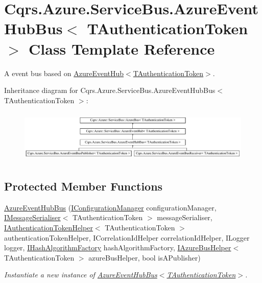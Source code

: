 \hypertarget{classCqrs_1_1Azure_1_1ServiceBus_1_1AzureEventHubBus}{}\section{Cqrs.\+Azure.\+Service\+Bus.\+Azure\+Event\+Hub\+Bus$<$ T\+Authentication\+Token $>$ Class Template Reference}
\label{classCqrs_1_1Azure_1_1ServiceBus_1_1AzureEventHubBus}


A event bus based on \hyperlink{classCqrs_1_1Azure_1_1ServiceBus_1_1AzureEventHub_a2b548165ac5b1e3d0312af5c62e3c6cd_a2b548165ac5b1e3d0312af5c62e3c6cd}{Azure\+Event\+Hub$<$\+T\+Authentication\+Token$>$}.  


Inheritance diagram for Cqrs.\+Azure.\+Service\+Bus.\+Azure\+Event\+Hub\+Bus$<$ T\+Authentication\+Token $>$\+:\begin{figure}[H]
\begin{center}
\leavevmode
\includegraphics[height=2.533937cm]{classCqrs_1_1Azure_1_1ServiceBus_1_1AzureEventHubBus}
\end{center}
\end{figure}
\subsection*{Protected Member Functions}
\begin{DoxyCompactItemize}
\item 
\hyperlink{classCqrs_1_1Azure_1_1ServiceBus_1_1AzureEventHubBus_a1012686c6448f1cee1d06aca0a605df4_a1012686c6448f1cee1d06aca0a605df4}{Azure\+Event\+Hub\+Bus} (\hyperlink{interfaceCqrs_1_1Configuration_1_1IConfigurationManager}{I\+Configuration\+Manager} configuration\+Manager, \hyperlink{interfaceCqrs_1_1Azure_1_1ServiceBus_1_1IMessageSerialiser}{I\+Message\+Serialiser}$<$ T\+Authentication\+Token $>$ message\+Serialiser, \hyperlink{interfaceCqrs_1_1Authentication_1_1IAuthenticationTokenHelper}{I\+Authentication\+Token\+Helper}$<$ T\+Authentication\+Token $>$ authentication\+Token\+Helper, I\+Correlation\+Id\+Helper correlation\+Id\+Helper, I\+Logger logger, \hyperlink{interfaceCqrs_1_1Bus_1_1IHashAlgorithmFactory}{I\+Hash\+Algorithm\+Factory} hash\+Algorithm\+Factory, \hyperlink{interfaceCqrs_1_1Azure_1_1ServiceBus_1_1IAzureBusHelper}{I\+Azure\+Bus\+Helper}$<$ T\+Authentication\+Token $>$ azure\+Bus\+Helper, bool is\+A\+Publisher)
\begin{DoxyCompactList}\small\item\em Instantiate a new instance of \hyperlink{classCqrs_1_1Azure_1_1ServiceBus_1_1AzureEventHubBus_a1012686c6448f1cee1d06aca0a605df4_a1012686c6448f1cee1d06aca0a605df4}{Azure\+Event\+Hub\+Bus$<$\+T\+Authentication\+Token$>$}. \end{DoxyCompactList}\end{DoxyCompactItemize}
